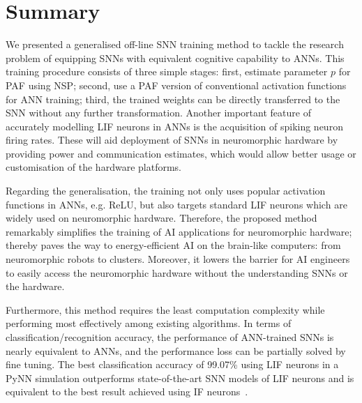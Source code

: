 \section{Summary}
	We presented a generalised off-line SNN training method to tackle the research problem of equipping SNNs with equivalent cognitive capability to ANNs.
	This training procedure consists of three simple stages: first, estimate parameter $p$ for PAF using NSP; second, use a PAF version of conventional activation functions for ANN training; %
	third, the trained weights can be directly transferred to the SNN without any further transformation.
	Another important feature of accurately modelling LIF neurons in ANNs is the acquisition of spiking neuron firing rates. These will aid deployment of SNNs in neuromorphic hardware by providing power and communication estimates, which would allow better usage or customisation of the hardware platforms.
	
	
	Regarding the generalisation, the training not only uses popular activation functions in ANNs, e.g. ReLU, but also targets standard LIF neurons which are widely used on neuromorphic hardware.
	Therefore, the proposed method remarkably simplifies the training of AI applications for neuromorphic hardware;
	thereby paves the way to energy-efficient AI on the brain-like computers: from neuromorphic robots to clusters.
	Moreover, it lowers the barrier for AI engineers to easily access the neuromorphic hardware without the understanding SNNs or the hardware.
	
	Furthermore, this method requires the least computation complexity while performing most effectively among existing algorithms.
	In terms of classification/recognition accuracy, the performance of ANN-trained SNNs is nearly equivalent to ANNs, and the performance loss can be partially solved by fine tuning.
	The best classification accuracy of 99.07\% using LIF neurons in a PyNN simulation outperforms state-of-the-art SNN models of LIF neurons and is equivalent to the best result achieved using IF neurons~\citep{diehl2015fast}.
